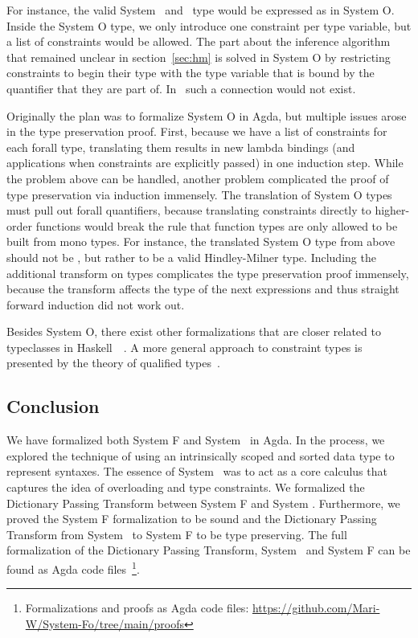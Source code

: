 \noindent For instance, the valid System \Fo\ and \HMo\ type  would be expressed as  in System O. 
Inside the System O type, we only introduce one constraint per type variable, but a list of constraints would be allowed. 
The part about the inference algorithm that remained unclear in section~\ref{sec:hm} is solved in System O by restricting constraints to begin their type with the type variable that is bound by the quantifier that they are part of. 
In \HMo\ such a connection would not exist.

\noindent Originally the plan was to formalize System O in Agda, but multiple issues arose in the type preservation proof. 
First, because we have a list of  constraints for each forall type, translating them results in  new lambda bindings (and  applications when constraints are explicitly passed) in one induction step. 
While the problem above can be handled, another problem complicated the proof of type preservation via induction immensely. The translation of System O types must pull out forall quantifiers, because translating constraints directly to higher-order functions would break the rule that function types are only allowed to be built from mono types. 
For instance, the translated System O type from above should not be , but rather  to be a valid Hindley-Milner type. 
Including the additional transform on types complicates the type preservation proof immensely, because the transform affects the type of the next  expressions and thus straight forward induction did not work out.

\noindent Besides System O, there exist other formalizations that are closer related to typeclasses in Haskell~\cite{ahp}~\cite{tc}. A more general approach to constraint types is presented by the theory of qualified types~\cite{qt}.

\subsection{Conclusion}
We have formalized both System F and System \Fo\ in Agda.
In the process, we explored the technique of using an intrinsically scoped and sorted data type to represent syntaxes.
The essence of System \Fo\ was to act as a core calculus that captures the idea of overloading and type constraints.
We formalized the Dictionary Passing Transform between System F and System \Fo. 
Furthermore, we proved the System F formalization to be sound and the Dictionary Passing Transform from System \Fo\ to System F to be type preserving. 
The full formalization of the Dictionary Passing Transform, System \Fo\ and  System F can be found as Agda code files~\footnote{Formalizations and proofs as Agda code files: \url{https://github.com/Mari-W/System-Fo/tree/main/proofs}}. 

